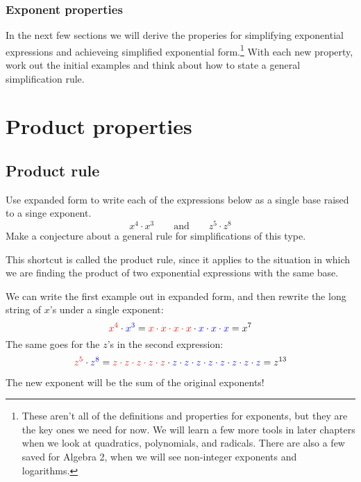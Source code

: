 \subsubsection{Exponent properties}

In the next few sections we will derive the properies for simplifying exponential expressions and achieveing simplified exponential form.\footnote{These aren't all of the definitions and properties for exponents, but they are the key ones we need for now. We will learn a few more tools in later chapters when we look at quadratics, polynomials, and radicals. There are also a few saved for Algebra 2, when we will see non-integer exponents and logarithms.} With each new property, work out the initial examples and think about how to state a general simplification rule.

\section{Product properties}
\label{sec:expoproduct}

\subsection{Product rule}

\begin{boxedexplore}
Use expanded form to write each of the expressions below as a single base raised to a singe exponent.
\[x^4 \cdot x^3 \qquad\text{and}\qquad z^5 \cdot z^8\]
Make a conjecture about a general rule for simplifications of this type.
\end{boxedexplore}

This shortcut is called the product rule, since it applies to the situation in which we are finding the product of two exponential expressions with the same base.

We can write the first example out in expanded form, and then rewrite the long string of $x$'s under a single exponent:
\[{\color{red}x^4} \cdot {\color{blue}x^3} = {\color{red}x \cdot x \cdot x \cdot x} \cdot {\color{blue}x \cdot x \cdot x} = x^7\]
The same goes for the $z$'s in the second expression:
\[{\color{red}z^5} \cdot {\color{blue}z^8} = {\color{red}z \cdot z \cdot z \cdot z \cdot z} \cdot {\color{blue}z \cdot z \cdot z \cdot z \cdot z \cdot z \cdot z \cdot z} = z^{13}\]

The new exponent will be the sum of the original exponents!

